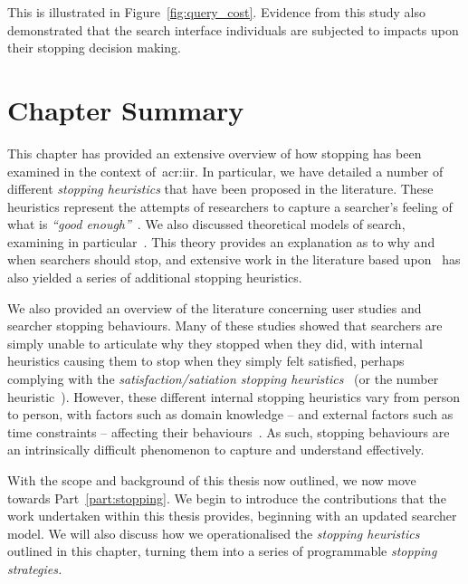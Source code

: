 This is illustrated in Figure~\ref{fig:query_cost}. Evidence from this study also demonstrated that the search interface individuals are subjected to impacts upon their stopping decision making.

\section{Chapter Summary}
This chapter has provided an extensive overview of how stopping has been examined in the context of~\gls{acr:iir}. In particular, we have detailed a number of different \emph{stopping heuristics} that have been proposed in the literature. These heuristics represent the attempts of researchers to capture a searcher's feeling of what is \emph{``good enough''}~\citep{zach2005enough_is_enough}. We also discussed theoretical models of search, examining in particular~. This theory provides an explanation as to why and when searchers should stop, and extensive work in the literature based upon~ has also yielded a series of additional stopping heuristics.

We also provided an overview of the literature concerning user studies and searcher stopping behaviours. Many of these studies showed that searchers are simply unable to articulate why they stopped when they did, with internal heuristics causing them to stop when they simply felt satisfied, perhaps complying with the \emph{satisfaction/satiation stopping heuristics}~\citep{cooper1973retrieval_effectiveness_ii, kraft1979stopping_rules} (or the number heuristic~\citep{gibb1958number_rule}). However, these different internal stopping heuristics vary from person to person, with factors such as domain knowledge -- and external factors such as time constraints -- affecting their behaviours~\citep{marchionini1995information_seeking}. As such, stopping behaviours are an intrinsically difficult phenomenon to capture and understand effectively.

With the scope and background of this thesis now outlined, we now move towards Part~\ref{part:stopping}. We begin to introduce the contributions that the work undertaken within this thesis provides, beginning with an updated searcher model. We will also discuss how we operationalised the \emph{stopping heuristics} outlined in this chapter, turning them into a series of programmable \emph{stopping strategies.}